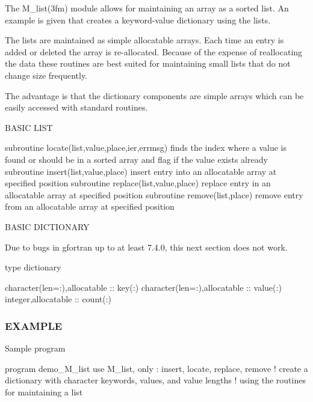 \begin{DoxyVerb}The M_list(3fm) module allows for maintaining an array as a sorted
list. An example is given that creates a keyword-value dictionary
using the lists.

The lists are maintained as simple allocatable arrays. Each time an
entry is added or deleted the array is re-allocated. Because of the
expense of reallocating the data these routines are best suited for
maintaining small lists that do not change size frequently.

The advantage is that the dictionary components are simple arrays
which can be easily accessed with standard routines.

BASIC LIST

subroutine locate(list,value,place,ier,errmsg)  finds the index where a
                                                value is found or should
                                                be in a sorted array and
                                                flag if the value exists
                                                already
subroutine insert(list,value,place)     insert entry into an allocatable
                                        array at specified position
subroutine replace(list,value,place)    replace entry in an allocatable
                                        array at specified position
subroutine remove(list,place)           remove entry from an allocatable
                                        array at specified position

BASIC DICTIONARY

Due to bugs in gfortran up to at least 7.4.0, this next section
does not work.

type dictionary

   character(len=:),allocatable :: key(:)
   character(len=:),allocatable :: value(:)
   integer,allocatable          :: count(:)

\end{DoxyVerb}


\subsubsection*{E\+X\+A\+M\+P\+LE}

Sample program

program demo\+\_\+\+M\+\_\+list use M\+\_\+list, only \+: insert, locate, replace, remove ! create a dictionary with character keywords, values, and value lengths ! using the routines for maintaining a list

